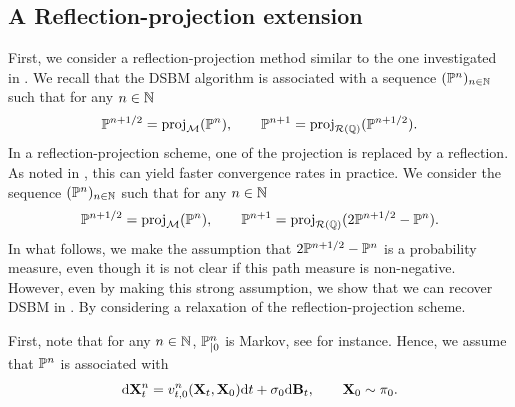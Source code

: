 \documentclass{article}
\begin{document}
\subsection{A Reflection-projection extension}
\label{sec:reflection_projection_appendix}

First, we consider a reflection-projection method similar to the one investigated in \cite{bauschke2004reflection}. We recall that the DSBM algorithm is associated with a sequence $(\mathbb{P}^n)_{n \in \mathbb{N}}$ such that for any $n \in \mathbb{N}$
\begin{equation}
    \mathbb{P}^{n+1/2} = \mathrm{proj}_{\mathcal{M}}(\mathbb{P}^n) , \qquad \mathbb{P}^{n+1} = \mathrm{proj}_{\mathcal{R}(\mathbb{Q})}(\mathbb{P}^{n+1/2}) .  
\end{equation}
In a reflection-projection scheme, one of the projection is replaced by a reflection. As noted in \cite{bauschke2004reflection}, this can yield faster convergence rates in practice. We consider the sequence $(\mathbb{P}^n)_{n \in \mathbb{N}}$ such that for any $n \in \mathbb{N}$
\begin{equation}
\label{eq:iteration_reflection_projection}
    \Pbb^{n+1/2} = \projM(\Pbb^n) , \qquad \Pbb^{n+1} = \projR{\Qbb}(2\Pbb^{n+1/2} - \Pbb^n) .  
\end{equation}
In what follows, we make the assumption that $2\mathbb{P}^{n+1/2} - \mathbb{P}^n$ is a probability measure, even though it is not clear if this path measure is non-negative. However, even by making this strong assumption, we show that we can recover DSBM in . By considering a relaxation of the reflection-projection scheme. 

First, note that for any $n \in \mathbb{N}$, $\mathbb{P}^n_{|0}$ is Markov, see \cite{debortoli2023augmented} for instance. Hence, we assume that $\mathbb{P}^n$ is associated with 
\begin{equation}
\label{eq:markov_reciprocal}
    \rmd \bfX_t^n = v_{t,0}^n(\bfX_t, \bfX_0) \rmd t + \sigma_0 \rmd \bfB_t , \qquad \bfX_0 \sim \pi_0 . 
\end{equation}
\end{document}
